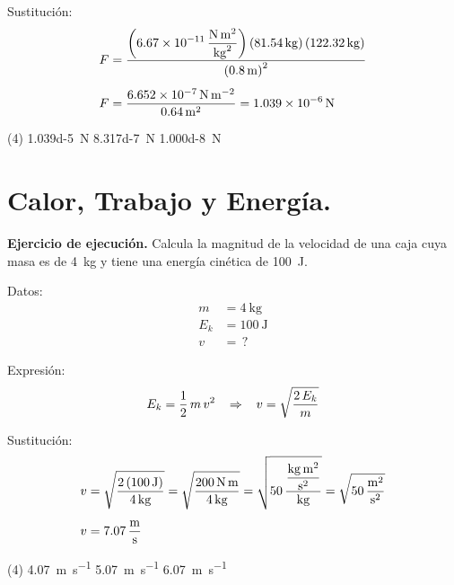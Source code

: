 \documentclass[12pt, letter]{exam}
\begin{document}
\begin{questions}
    Sustitución:
    \begin{align*}
    F &= \dfrac{\left( \displaystyle \SI[per-mode=fraction]{6.67d-11}{\newton\square\meter\per\square\kilo\gram} \right) \left( \SI{81.54}{\kilo\gram} \right) \left( \SI{122.32}{\kilo\gram} \right)}{\left( \SI{0.8}{\meter} \right)^{2}} \\[0.5em]
    F &= \dfrac{\SI{6.652d-7}{\newton\per\square\meter}}{\SI{0.64}{\square\meter}} = \SI{1.039d-6}{\newton}
    \end{align*}
    
    \begin{tasks}(4)
        \task \SI{1.039d-5}{\newton}
        \task {}
        \task \SI{8.317d-7}{\newton}
        \task \SI{1.000d-8}{\newton}
    \end{tasks}

    \setcounter{section}{11}

    \section{Calor, Trabajo y Energía.}

    \setcounter{question}{33} \question \label{Ejercicio_12} \textbf{Ejercicio de ejecución. } Calcula la magnitud de la velocidad de una caja cuya masa es de \SI{4}{\kilo\gram} y tiene una energía cinética de \SI{100}{\joule}.

    \begin{minipage}[t]{0.35\linewidth}
    Datos: 
    \begin{align*}
    m &= \SI{4}{\kilo\gram} \\
    E_{k} &= \SI{100}{\joule} \\
    v &= \, ?
    \end{align*}
    \end{minipage}
    \hspace{1cm}
    \begin{minipage}[t]{0.4\linewidth}
    Expresión:
    \begin{align*}
    E_{k} = \dfrac{1}{2} \, m \, v^{2} \hspace{0.3cm} \Rightarrow \hspace{0.3cm} v = \sqrt{\dfrac{2 \, E_{k}}{m}}
    \end{align*}
    \end{minipage}

    Sustitución:
    \begin{align*}
    v &= \sqrt{\dfrac{2 \left( \SI{100}{\joule} \right)}{\SI{4}{\kilo\gram}}} = \sqrt{\dfrac{\SI{200}{\newton\meter}}{\SI{4}{\kilo\gram}}} = \sqrt{50 \, \dfrac{\displaystyle \unit[per-mode=fraction]{\kilo\gram\square\meter\per\square\second}}{\unit{\kilo\gram}}} = \sqrt{\SI[per-mode=fraction]{50}{\square\meter\per\square\second}} \\[0.5em]
    v &= \SI[per-mode=fraction]{7.07}{\meter\per\second}
    \end{align*}
    \begin{tasks}(4)
        \task \SI{4.07}{\meter\per\second}
        \task \SI{5.07}{\meter\per\second}
        \task \SI{6.07}{\meter\per\second}
        \task {}
    \end{tasks}


\end{questions}
\end{document}

